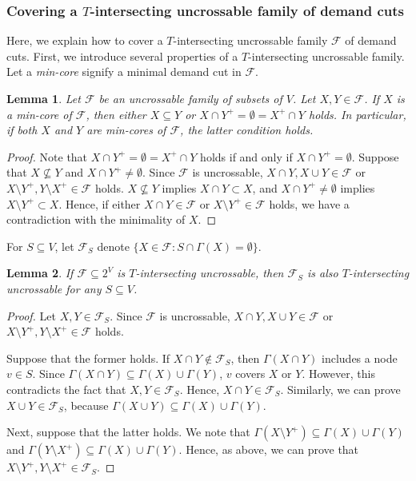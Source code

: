 \documentclass[11pt]{article}
\newcommand{\Ffam}{\mathcal{F}}
\newtheorem{lemma}{Lemma}
\begin{document}
 \subsubsection{Covering a $T$-intersecting uncrossable family of demand cuts}
\label{sssec.covering}
 
 Here, we explain how to cover a $T$-intersecting uncrossable family $\Ffam$ of demand cuts.
 First, we introduce several properties of a $T$-intersecting uncrossable family.
 Let a \emph{min-core} signify a minimal demand cut in $\Ffam$.


 
 \begin{lemma}
  \label{lem.disjoint}
 Let $\Ffam$ be an uncrossable family of subsets of $V$. Let $X,Y \in
 \Ffam$.
 If $X$ is a min-core of $\Ffam$, then 
 either $X \subseteq Y$ or $X \cap Y^+=\emptyset=X^+\cap Y$ holds.
 In particular, if both $X$ and $Y$ are min-cores of $\Ffam$,
  the latter condition holds.
 \end{lemma}
  \begin{proof}
   Note that
   $X \cap Y^+=\emptyset=X^+\cap Y$ holds if and only if $X \cap Y^+ = \emptyset$.
 Suppose that $X \not\subseteq Y$ and
 $X \cap Y^+\neq \emptyset$.
 Since $\Ffam$ is uncrossable, $X \cap Y, X\cup Y \in \Ffam$ or
 $X\setminus Y^+, Y \setminus X^+ \in \Ffam$ holds.
 $X\not\subseteq Y$ implies $X \cap Y \subset X$,
  and $X\cap Y^+ \neq \emptyset$ implies $X \setminus Y^+ \subset X$.
  Hence, if either $X \cap Y \in \Ffam$
  or $X\setminus Y^+ \in \Ffam$ holds, we have a contradiction with the minimality of $X$.
  \end{proof}

For $S \subseteq V$,
let $\Ffam_S$ denote $\{X \in \Ffam \colon S \cap
\Gamma(X)=\emptyset\}$.

 \begin{lemma}
  \label{lem.residual}
 If $\Ffam \subseteq 2^V$ is $T$-intersecting uncrossable, then
  $\Ffam_S$ is also $T$-intersecting uncrossable
 for any $S \subseteq V$.
 \end{lemma}
\begin{proof}
 Let $X,Y \in \Ffam_S$. Since $\Ffam$ is uncrossable, $X\cap Y, X\cup Y
 \in \Ffam$ or $X\setminus Y^+, Y\setminus X^+ \in \Ffam$ holds.

 Suppose that the former holds.
 If $X \cap Y \not\in \Ffam_S$, then $\Gamma(X\cap Y)$ includes a node
 $v \in S$. Since $\Gamma(X\cap Y) \subseteq \Gamma(X)\cup \Gamma(Y)$,
 $v$ covers $X$ or $Y$. However, this contradicts the fact that $X,Y \in
 \Ffam_S$. Hence, $X\cap Y\in \Ffam_S$.
 Similarly, we can prove $X\cup Y \in \Ffam_S$, because
 $\Gamma(X\cup Y) \subseteq \Gamma(X)\cup \Gamma(Y)$.

 Next, suppose that the latter holds.
 We note that
 $\Gamma(X \setminus Y^+) \subseteq \Gamma(X) \cup \Gamma(Y)$ and
 $\Gamma(Y\setminus X^+) \subseteq \Gamma(X) \cup \Gamma(Y)$.
 Hence, as above, we can prove that
 $X \setminus Y^+, Y\setminus X^+ \in \Ffam_S$.
\end{proof}
\end{document}
